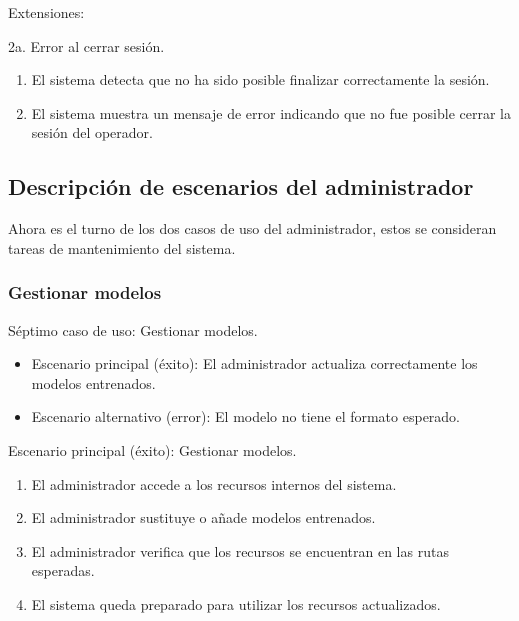 \documentclass[12pt,a4paper]{report}
\begin{document}
\medskip

\noindent Extensiones:

2a. Error al cerrar sesión.
\begin{enumerate}[leftmargin=1.5cm]
    \item El sistema detecta que no ha sido posible finalizar correctamente la sesión.
    \item El sistema muestra un mensaje de error indicando que no fue posible cerrar la sesión del operador.
\end{enumerate}

\medskip

\subsection{Descripción de escenarios del administrador}

Ahora es el turno de los dos casos de uso del administrador, estos se consideran tareas de mantenimiento del sistema.

\medskip

\subsubsection{Gestionar modelos}

\noindent Séptimo caso de uso: Gestionar modelos.

\begin{itemize}[leftmargin=1.5cm]
    \item Escenario principal (éxito): El administrador actualiza correctamente los modelos entrenados.
    \item Escenario alternativo (error): El modelo no tiene el formato esperado.
\end{itemize}

\medskip

\noindent Escenario principal (éxito): Gestionar modelos.
\begin{enumerate}[leftmargin=1.5cm]
    \item El administrador accede a los recursos internos del sistema.
    \item El administrador sustituye o añade modelos entrenados.
    \item El administrador verifica que los recursos se encuentran en las rutas esperadas.
    \item El sistema queda preparado para utilizar los recursos actualizados.
\end{enumerate}
\end{document}
